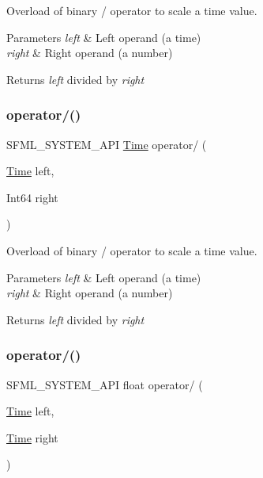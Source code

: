 Overload of binary / operator to scale a time value. 


\begin{DoxyParams}{Parameters}
{\em left} & Left operand (a time) \\
\hline
{\em right} & Right operand (a number)\\
\hline
\end{DoxyParams}
\begin{DoxyReturn}{Returns}
{\itshape left} divided by {\itshape right} 
\end{DoxyReturn}
\mbox{\label{classsf_1_1_time_ab72f2de3e2bb592b4b4008dc1ac79056}} 
\subsubsection{\texorpdfstring{operator/()}{operator/()}\hspace{0.1cm}{\footnotesize\ttfamily [2/3]}}
{\footnotesize\ttfamily S\+F\+M\+L\+\_\+\+S\+Y\+S\+T\+E\+M\+\_\+\+A\+PI \hyperlink{classsf_1_1_time}{Time} operator/ (\begin{DoxyParamCaption}\item[{\hyperlink{classsf_1_1_time}{Time}}]{left,  }\item[{Int64}]{right }\end{DoxyParamCaption})\hspace{0.3cm}{\ttfamily [related]}}



Overload of binary / operator to scale a time value. 


\begin{DoxyParams}{Parameters}
{\em left} & Left operand (a time) \\
\hline
{\em right} & Right operand (a number)\\
\hline
\end{DoxyParams}
\begin{DoxyReturn}{Returns}
{\itshape left} divided by {\itshape right} 
\end{DoxyReturn}
\mbox{\label{classsf_1_1_time_ac3ae4f4d24a93e088d8e36d68322ea0f}} 
\subsubsection{\texorpdfstring{operator/()}{operator/()}\hspace{0.1cm}{\footnotesize\ttfamily [3/3]}}
{\footnotesize\ttfamily S\+F\+M\+L\+\_\+\+S\+Y\+S\+T\+E\+M\+\_\+\+A\+PI float operator/ (\begin{DoxyParamCaption}\item[{\hyperlink{classsf_1_1_time}{Time}}]{left,  }\item[{\hyperlink{classsf_1_1_time}{Time}}]{right }\end{DoxyParamCaption})\hspace{0.3cm}{\ttfamily [related]}}



